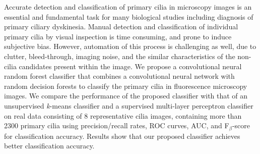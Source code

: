 Accurate detection and classification of primary cilia in microscopy images is an essential and fundamental task for many biological studies including diagnosis of primary ciliary dyskinesia. Manual detection and classification of individual primary cilia by visual inspection is time consuming, and prone to induce subjective bias. However, automation of this process is challenging as well, due to clutter, bleed-through, imaging noise, and the similar characteristics of the non-cilia candidates present within the image. We propose a convolutional neural random forest classifier that combines a convolutional neural network with random decision forests to classify the primary cilia in fluorescence microscopy images. We compare the performance of the proposed classifier with that of an unsupervised \emph{k}-means classifier and a supervised multi-layer perceptron classifier on real data consisting of 8 representative cilia images, containing more than 2300 primary cilia using precision/recall rates, ROC curves, AUC, and F$_{\beta}$-score for classification accuracy. Results show that our proposed classifier achieves better classification accuracy.
